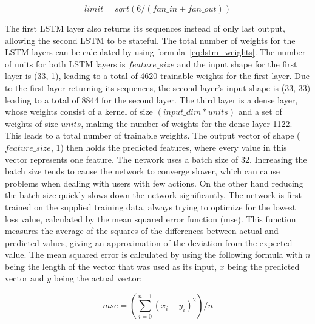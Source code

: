 \begin{equation}
limit = sqrt(6 / (fan\_in + fan\_out))
\end{equation}

The first LSTM layer also returns its sequences instead of only last output, allowing the second LSTM to be stateful. The total number of weights for the LSTM layers can be calculated by using formula~\ref{eq:lstm_weights}. The number of units for both LSTM layers is \(feature\_size\) and the input shape for the first layer is (33, 1), leading to a total of 4620 trainable weights for the first layer. Due to the first layer returning its sequences, the second layer's input shape is (33, 33) leading to a total of 8844 for the second layer. The third layer is a dense layer, whose weights consist of a kernel of size \((input\_dim * units)\) and a set of weights of size \(units\), making the number of weights for the dense layer 1122. This leads to a total number of trainable weights. The output vector of shape (\(feature\_size\), 1) then holds the predicted features, where every value in this vector represents one feature. The network uses a batch size of 32. Increasing the batch size tends to cause the network to converge slower, which can cause problems when dealing with users with few actions. On the other hand reducing the batch size quickly slows down the network significantly. The network is first trained on the supplied training data, always trying to optimize for the lowest loss value, calculated by the mean squared error function (mse). This function measures the average of the squares of the differences between actual and predicted values, giving an approximation of the deviation from the expected value. The mean squared error is calculated by using the following formula with \(n\) being the length of the vector that was used as its input, \(x\) being the predicted vector and \(y\) being the actual vector:

\begin{equation} \label{eq:mse}
mse = (\sum\limits_{i=0}^{n - 1} {(x_i - y_i)}^2) / n
\end{equation}


